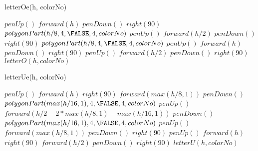 \documentclass[a4paper,10pt]{article}
\begin{document}
\begin{algorithm}
\caption{letterOe(h, colorNo)}
\begin{algorithmic}[5]

\STATE {}
\STATE {}
  \STATE \(penUp()\)
  \STATE \(forward(h)\)
  \STATE \(penDown()\)
  \STATE \(right(90)\)
  \STATE {}
  \STATE {}
  \STATE \(polygonPart(h/8,4,\FALSE,4,colorNo)\)
  \STATE \(penUp()\)
  \STATE \(forward(h/2)\)
  \STATE \(penDown()\)
  \STATE \(right(90)\)
  \STATE {}
  \STATE {}
  \STATE \(polygonPart(h/8,4,\FALSE,4,colorNo)\)
  \STATE \(penUp()\)
  \STATE \(forward(h)\)
  \STATE \(penDown()\)
  \STATE \(right(90)\)
  \STATE \(penUp()\)
  \STATE \(forward(h/2)\)
  \STATE \(penDown()\)
  \STATE \(right(90)\)
  \STATE \(letterO(h,colorNo)\)

\end{algorithmic}
\end{algorithm}


\begin{algorithm}
\caption{letterUe(h, colorNo)}
\begin{algorithmic}[5]

\STATE {}
\STATE {}
  \STATE \(penUp()\)
  \STATE \(forward(h)\)
  \STATE \(right(90)\)
  \STATE \(forward(max(h/8,1))\)
  \STATE \(penDown()\)
  \STATE {}
  \STATE {}
  \STATE \(polygonPart(max(h/16,1),4,\FALSE,4,colorNo)\)
  \STATE \(penUp()\)
  \STATE \(forward(h/2-2*max(h/8,1)-max(h/16,1))\)
  \STATE \(penDown()\)
  \STATE {}
  \STATE {}
  \STATE \(polygonPart(max(h/16,1),4,\FALSE,4,colorNo)\)
  \STATE \(penUp()\)
  \STATE \(forward(max(h/8,1))\)
  \STATE \(penDown()\)
  \STATE \(right(90)\)
  \STATE \(penUp()\)
  \STATE \(forward(h)\)
  \STATE \(right(90)\)
  \STATE \(forward(h/2)\)
  \STATE \(penDown()\)
  \STATE \(right(90)\)
  \STATE \(letterU(h,colorNo)\)

\end{algorithmic}
\end{algorithm}
\end{document}
